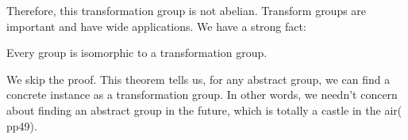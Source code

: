 \documentclass[b5paper]{article}
\begin{document}
Therefore, this transformation group is not abelian. Transform groups are important and have wide applications. We have a strong fact:

\begin{theorem}
Every group is isomorphic to a transformation group.
\end{theorem}

We skip the proof. This theorem tells us, for any abstract group, we can find a concrete instance as a transformation group. In other words, we needn't concern about finding an abstract group in the future, which is totally a castle in the air(\cite{ZhangHeRui1978} pp49).

\begin{Exercise}\label{ex:group-rules}
\end{Exercise}
\end{document}
